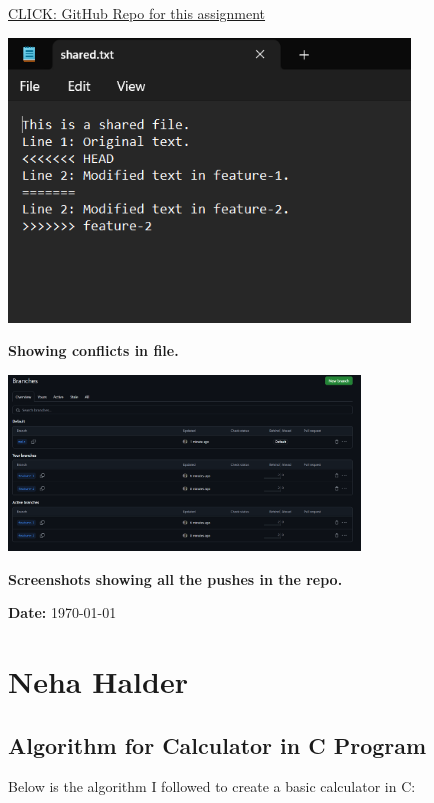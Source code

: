 \documentclass[a4paper,12pt]{article}
\begin{document}
\href{https://github.com/codeAtSin/git-advanced}{CLICK: GitHub Repo for this assignment}
\par\vspace{2em}
\includegraphics[width=0.8\textwidth]{conflictfile.png}
\par\vspace{2em}
\large\textbf{Showing conflicts in file.}
\par\vspace{2em}
\includegraphics[width=0.7\textwidth]{allpushes.png}
\par\vspace{2em}
\large\textbf{Screenshots showing all the pushes in the repo.}
\vspace{0.3in}


\newpage
{ \textbf{Date:} \today}
\section{Neha Halder}

\subsection{Algorithm for Calculator in C Program}

Below is the algorithm I followed to create a basic calculator in C:
\end{document}
